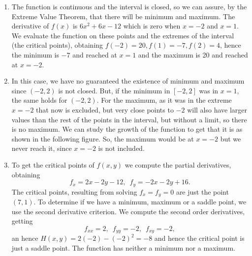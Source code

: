 \documentclass[11.0pt]{exam}
\begin{document}
\begin{questions}
\begin{solution}[0cm]
\begin{enumerate}
    \item The function is continuous and the interval is closed, so we can assure, by the Extreme Value Theorem, that there will be minimum and maximum. The derivative of $f(x)$ is $6x^2+6x-12$ which is zero when $x=-2$ and $x=1$. We evaluate the function on these points and the extremes of the interval (the critical points), obtaining $f(-2)=20, f(1)=-7, f(2)=4$, hence the minimum is $-7$ and reached at $x=1$ and the maximum is 20 and reached at $x=-2$.
    \item In this case, we have no guaranteed the existence of minimum and maximum since $(-2,2)$ is not closed. But, if the minimum in $[-2,2]$ was in $x=1$, the same holds for $(-2,2)$. For the maximum, as it was in the extreme $x=-2$ that now is excluded, but very close points to $-2$ will also have larger values than the rest of the points in the interval, but without a limit, so there is no maximum. We can study the growth of the function to get that it is as shown in the following figure. So, the maximum would be at $x=-2$ but we never reach it, since $x=-2$ is not included.
\begin{center}
\end{center}
\item To get the critical points of $f(x,y)$ we compute the partial derivatives, obtaining \[
   f_x=2x-2y-12,\enspace f_y=-2x-2y+16.
\] The critical points, resulting from solving $f_x=f_y=0$ are just the point $(7,1)$. To determine if we have a minimum, maximum or a saddle point, we use the second derivative criterion. We compute the second order derivatives, getting \[f_{xx}=2,\enspace f_{yy}=-2,\enspace f_{xy}=-2,\] an hence $H(x,y)=2(-2)-(-2)^2=-8$ and hence the critical point is just a saddle point. The function has neither a minimum nor a maximum.
\end{enumerate}
\end{solution}


\end{questions}
\end{document}
